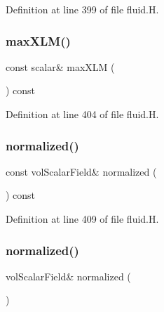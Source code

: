 Definition at line 399 of file fluid.\+H.

\mbox{\label{classFoam_1_1fluid_ab2ee7e33bb09dd3385bea0ac648622da}} 
\subsubsection{\texorpdfstring{max\+X\+L\+M()}{maxXLM()}}
{\footnotesize\ttfamily const scalar\& max\+X\+LM (\begin{DoxyParamCaption}{ }\end{DoxyParamCaption}) const\hspace{0.3cm}{\ttfamily [inline]}}



Definition at line 404 of file fluid.\+H.

\mbox{\label{classFoam_1_1fluid_acd6d0e52337be3f13bfd9fabf7061ec0}} 
\subsubsection{\texorpdfstring{normalized()}{normalized()}\hspace{0.1cm}{\footnotesize\ttfamily [1/2]}}
{\footnotesize\ttfamily const vol\+Scalar\+Field\& normalized (\begin{DoxyParamCaption}{ }\end{DoxyParamCaption}) const\hspace{0.3cm}{\ttfamily [inline]}}



Definition at line 409 of file fluid.\+H.

\mbox{\label{classFoam_1_1fluid_a7726af3fb6482cac4178c4546617c94a}} 
\subsubsection{\texorpdfstring{normalized()}{normalized()}\hspace{0.1cm}{\footnotesize\ttfamily [2/2]}}
{\footnotesize\ttfamily vol\+Scalar\+Field\& normalized (\begin{DoxyParamCaption}{ }\end{DoxyParamCaption})\hspace{0.3cm}{\ttfamily [inline]}}



